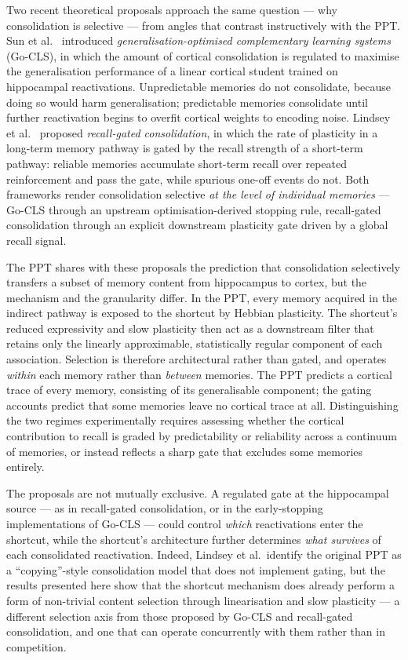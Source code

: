 Two recent theoretical proposals approach the same question --- why consolidation is selective --- from angles that contrast instructively with the PPT. Sun et al.\ \cite{Sun2023} introduced \emph{generalisation-optimised complementary learning systems} (Go-CLS), in which the amount of cortical consolidation is regulated to maximise the generalisation performance of a linear cortical student trained on hippocampal reactivations. Unpredictable memories do not consolidate, because doing so would harm generalisation; predictable memories consolidate until further reactivation begins to overfit cortical weights to encoding noise. Lindsey et al.\ \cite{Lindsey2024} proposed \emph{recall-gated consolidation}, in which the rate of plasticity in a long-term memory pathway is gated by the recall strength of a short-term pathway: reliable memories accumulate short-term recall over repeated reinforcement and pass the gate, while spurious one-off events do not. Both frameworks render consolidation selective \emph{at the level of individual memories} --- Go-CLS through an upstream optimisation-derived stopping rule, recall-gated consolidation through an explicit downstream plasticity gate driven by a global recall signal.

The PPT shares with these proposals the prediction that consolidation selectively transfers a subset of memory content from hippocampus to cortex, but the mechanism and the granularity differ. In the PPT, every memory acquired in the indirect pathway is exposed to the shortcut by Hebbian plasticity. The shortcut's reduced expressivity and slow plasticity then act as a downstream filter that retains only the linearly approximable, statistically regular component of each association. Selection is therefore architectural rather than gated, and operates \emph{within} each memory rather than \emph{between} memories. The PPT predicts a cortical trace of every memory, consisting of its generalisable component; the gating accounts predict that some memories leave no cortical trace at all. Distinguishing the two regimes experimentally requires assessing whether the cortical contribution to recall is graded by predictability or reliability across a continuum of memories, or instead reflects a sharp gate that excludes some memories entirely.

The proposals are not mutually exclusive. A regulated gate at the hippocampal source --- as in recall-gated consolidation, or in the early-stopping implementations of Go-CLS --- could control \emph{which} reactivations enter the shortcut, while the shortcut's architecture further determines \emph{what survives} of each consolidated reactivation. Indeed, Lindsey et al.\ identify the original PPT \cite{Remme2021} as a ``copying''-style consolidation model that does not implement gating, but the results presented here show that the shortcut mechanism does already perform a form of non-trivial content selection through linearisation and slow plasticity --- a different selection axis from those proposed by Go-CLS and recall-gated consolidation, and one that can operate concurrently with them rather than in competition.

